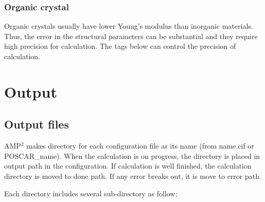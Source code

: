 \documentclass[letterpaper,10pt,english]{sphinxmanual}
\begin{document}
\subsection{Organic crystal}
\label{\detokenize{Input/Advanced_configuration:organic-crystal}}
Organic crystals usually have lower Young’s modulus than inorganic materials.
Thus, the error in the structural parameters can be substantial and they require
high precision for calculation. The tags below can control the precision of calculation.

\begin{sphinxVerbatim}[commandchars=\\\{\}]
     

   
   

   
   
\end{sphinxVerbatim}


\chapter{Output}
\label{\detokenize{Output/Output:output}}\label{\detokenize{Output/Output::doc}}

\section{Output files}
\label{\detokenize{Output/Output:output-files}}
AMP$^{\text{2}}$ makes directory for each configuration file as its name (from name.cif or POSCAR\_name).
When the calculation is on progress, the directory is
placed in output path in the configuration. If calculation is well finished, the calculation directory
is moved to done path. If any error breaks out, it is move to error path.

Each directory includes several sub-directory as follow;
\end{document}
